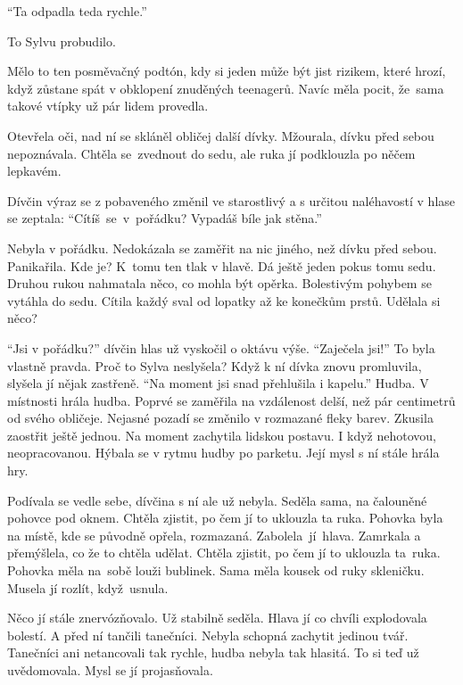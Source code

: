 \documentclass[10pt]{article}
\begin{document}
\begin{spacing}{1}
	\enquote{Ta odpadla teda rychle.}\par
	To Sylvu probudilo.\par
	Mělo to ten posměvačný podtón, kdy si jeden může být jist rizikem,
	které hrozí, když zůstane spát v obklopení znuděných teenagerů.
	Navíc měla pocit, že~sama takové vtípky už pár lidem provedla.\par
	Otevřela oči, nad ní se skláněl obličej další dívky.
	Mžourala, dívku před sebou nepoznávala.
	Chtěla se~zvednout do sedu, ale ruka jí podklouzla po něčem lepkavém.\par
	Dívčin výraz se z pobaveného změnil ve starostlivý
	a s určitou naléhavostí v hlase se zeptala:
	\enquote{Cítíš~se~v~pořádku? Vypadáš bíle jak stěna.}\par
	Nebyla v pořádku.
	Nedokázala se zaměřit na nic jiného, než dívku před sebou.
	Panikařila.
	Kde je?
	K~tomu ten tlak v hlavě.
	Dá ještě jeden pokus tomu sedu.
	Druhou rukou nahmatala něco, co mohla být opěrka.
	Bolestivým pohybem se vytáhla do sedu.
	Cítila každý sval od lopatky až ke konečkům prstů.
	Udělala si něco?\par
	\enquote{Jsi v pořádku?} dívčin hlas už vyskočil o oktávu výše.
	\enquote{Zaječela jsi!}
	To byla vlastně pravda.
	Proč to Sylva neslyšela? %
	Když k ní dívka znovu promluvila, slyšela jí nějak zastřeně.
	\enquote{Na moment jsi snad přehlušila i kapelu.}
	Hudba.
	V místnosti hrála hudba.
	Poprvé se zaměřila na vzdálenost delší,
	než pár centimetrů od svého obličeje.
	Nejasné pozadí se změnilo v rozmazané fleky barev.
	Zkusila zaostřit ještě jednou.
	Na moment zachytila lidskou postavu.
	I když nehotovou, neopracovanou.
	Hýbala se v rytmu hudby po parketu.
	Její mysl s ní stále hrála hry.\par
	Podívala se vedle sebe, dívčina s ní ale už nebyla.
	Seděla sama, na čalouněné pohovce pod oknem.
	Chtěla zjistit, po čem jí to uklouzla ta ruka.
	Pohovka byla na místě, kde se původně opřela, rozmazaná.
	Zabolela~jí~hlava.
	Zamrkala a přemýšlela, co že to chtěla udělat.
	Chtěla zjistit, po čem jí to uklouzla ta~ruka.
	Pohovka měla na~sobě louži bublinek.
	Sama měla kousek od ruky skleničku.
	Musela jí rozlít, když~usnula.\par
	Něco jí stále znervózňovalo.
	Už stabilně seděla.
	Hlava jí co chvíli explodovala bolestí.
	A před ní tančili tanečníci.
	Nebyla schopná zachytit jedinou tvář.	
	Tanečníci ani netancovali tak rychle, hudba nebyla tak hlasitá.
	To si teď už uvědomovala.
	Mysl se jí projasňovala.

\end{spacing}
\end{document}
